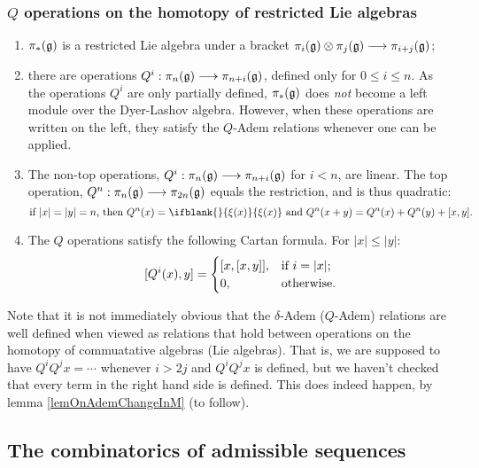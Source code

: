 \documentclass[10pt]{article}
\newcommand{\restn}[2][]{\ifblank{#1}{\xi{#2}}{\xi_{#1}{#2}}}%
\renewcommand{\Q}{Q}
\begin{document}
\begin{SteenrodAlgebrasAndTheirKoszulDuals}
\subsubsection{$\Q$ operations on the homotopy of restricted Lie algebras}
\begin{enumerate}\squishlist
\setlength{\parindent}{.25in}
\item $\pi_*(\mathfrak{g})$ is a restricted Lie algebra under a bracket $\pi_i(\mathfrak{g})\otimes \pi_j(\mathfrak{g})\longrightarrow \pi_{i+j}(\mathfrak{g})$;
\item there are operations $\Q^i:\pi_n(\frakg)\to \pi_{n+i}(\frakg)$, defined only for $0\leq i\leq n$. As the operations $\Q^i$ are only partially defined, $\pi_*(\mathfrak{g})$ does \emph{not} become a left module over the Dyer-Lashov algebra. However, when these operations are written on the left, they satisfy the $\Q$-Adem relations whenever one can be applied.
\item The non-top operations, $\Q^i:\pi_n(\frakg)\to \pi_{n+i}(\frakg)$ for $i<n$, are linear. The top operation, $\Q^n:\pi_n(\frakg)\to \pi_{2n}(\frakg)$ equals the restriction, and is thus quadratic:
\[\textup{if $|x|=|y|=n$, then }\Q^n(x)=\restn{(x)}\textup{ and }\Q^n(x+y)=\Q^n(x)+\Q^n(y)+[x,y].\]
\item The $\Q$ operations satisfy the following Cartan formula. For $|x|\leq |y|$:
\[[\Q^i(x),y]=\begin{cases}
[x,[x,y]],&\textup{if }i=|x|;\\
0,&\textup{otherwise}.
\end{cases}
\]
\end{enumerate}

Note that it is not immediately obvious that the $\delta$-Adem ($\Q$-Adem) relations are well defined when viewed as relations that hold between operations on the homotopy of commuatative algebras (Lie algebras). That is, we are supposed to have $\Q^i\Q^jx=\cdots $ whenever $i>2j$ and $\Q^i\Q^jx$ is defined, but we haven't checked that every term in the right hand side is defined. This does indeed happen, by lemma \ref{lemOnAdemChangeInM} (to follow). 

\subsection{The combinatorics of admissible sequences}


\end{SteenrodAlgebrasAndTheirKoszulDuals}
\end{document}

